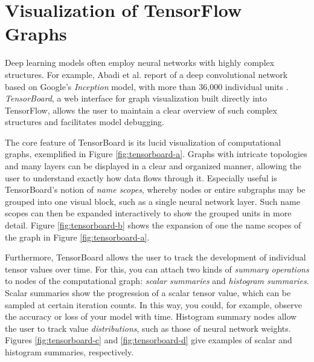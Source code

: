 \section{Visualization of TensorFlow Graphs}\label{sec:visual}

Deep learning models often employ neural networks with highly complex
structures. For example, Abadi et al. report of a deep convolutional network
based on Google's \emph{Inception} model, with more than 36,000 individual units
\cite{tensorflow}. \emph{TensorBoard}, a web interface for graph visualization
built directly into TensorFlow, allows the user to maintain a clear overview of
such complex structures and facilitates model debugging.

The core feature of TensorBoard is its lucid visualization of computational
graphs, exemplified in Figure \ref{fig:tensorboard-a}. Graphs with intricate
topologies and many layers can be displayed in a clear and organized manner,
allowing the user to understand exactly how data flows through it. Especially
useful is TensorBoard's notion of \emph{name scopes}, whereby nodes or entire
subgraphs may be grouped into one visual block, such as a single neural network
layer. Such name scopes can then be expanded interactively to show the grouped
units in more detail. Figure \ref{fig:tensorboard-b} shows the expansion of one
the name scopes of the graph in Figure \ref{fig:tensorboard-a}.

Furthermore, TensorBoard allows the user to track the development of individual
tensor values over time. For this, you can attach two kinds of \emph{summary
  operations} to nodes of the computational graph: \emph{scalar summaries} and
\emph{histogram summaries}. Scalar summaries show the progression of a scalar
tensor value, which can be sampled at certain iteration counts. In this way, you
could, for example, observe the accuracy or loss of your model with
time. Histogram summary nodes allow the user to track value
\emph{distributions}, such as those of neural network weights. Figures
\ref{fig:tensorboard-c} and \ref{fig:tensorboard-d} give examples of scalar and
histogram summaries, respectively.

